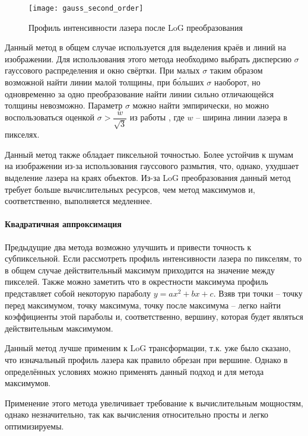                 \begin{wrapfigure}{r}{0.4\linewidth}
                    \centering
                    \texttt{[image: gauss\_second\_order]}
                    \caption{Профиль интенсивности лазера после LoG преобразования}
                \end{wrapfigure}
                Данный метод в общем случае используется для выделения краёв и линий на изображении\cite{Steger2000}. Для использования этого метода необходимо выбрать дисперсию $ \sigma $ гауссового распределения и окно свёртки. При малых $ \sigma $ таким образом возможной найти линии малой толщины, при б\'{о}льших $ \sigma $ наоборот, но одновременно за одно преобразование найти линии сильно отличающейся толщины невозможно. Параметр $ \sigma $ можно найти эмпирически, но можно воспользоваться оценкой $ \sigma > \dfrac{w}{\sqrt{3}} $ из работы \cite{Steger2000}, где $ w $ -- ширина линии лазера в пикселях.
                
                Данный метод также обладает пиксельной точностью. Более устойчив к шумам на изображении из-за использования гауссового размытия, что, однако, ухудшает выделение лазера на краях объектов. Из-за LoG преобразования данный метод требует больше вычислительных ресурсов, чем метод максимумов и, соответственно, выполняется медленнее.
            
            \paragraph{Квадратичная аппроксимация}
                Предыдущие два метода возможно улучшить и привести точность к субпиксельной\cite{Molder2014}. Если рассмотреть профиль интенсивности лазера по пикселям, то в общем случае действительный максимум приходится на значение между пикселей. Также можно заметить что в окрестности максимума профиль представляет собой некоторую параболу $ y = ax^2 + bx + c $. Взяв три точки -- точку перед максимумом, точку максимума, точку после максимума -- легко найти коэффициенты этой параболы и, соответственно, вершину, которая будет являться действительным максимумом.
                
                Данный метод лучше применим к LoG трансформации, т.к. уже было сказано, что изначальный профиль лазера как правило обрезан при вершине. Однако в определённых условиях можно применять данный подход и для метода максимумов.
                
                Применение этого метода увеличивает требование к вычислительным мощностям, однако незначительно, так как вычисления относительно просты и легко оптимизируемы.
            
